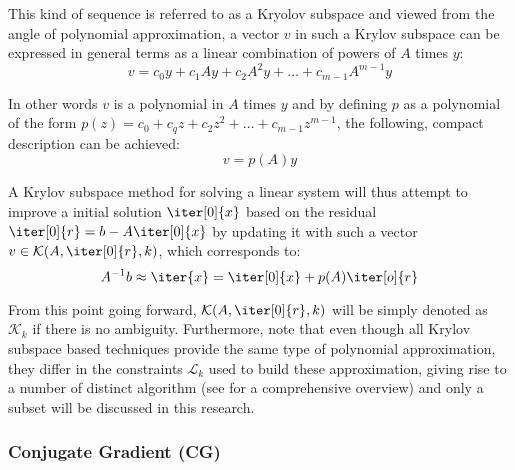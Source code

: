 \noindent This kind of sequence is referred to as a Kryolov subspace and viewed from the angle of polynomial approximation, a vector $v$ in such a Krylov subspace can be expressed in general terms as a linear combination of powers of $A$ times $y$:
\begin{equation}
\label{eqn:poly1}
    v = c_0y+c_1Ay+c_2A^2y+\dots+c_{m-1}A^{m-1}y
\end{equation}

\noindent In other words $v$ is a polynomial in $A$ times $y$ and by defining $p$ as a polynomial of the form $p(z) = c_0+c_qz+c_2z^2+\dots+c_{m-1}z^{m-1}$, the following, compact description can be achieved:
\begin{equation}
\label{eqn:poly2}
v=p(A)y  
\end{equation}

\noindent A Krylov subspace method for solving a linear system will thus attempt to improve a initial solution $\iter[0]{x}$ based on the residual $\iter[0]{r} = b-A\iter[0]{x}$ by updating it with such a vector $v \in \mathcal{K}(A, \iter[0]{r},k)$, which corresponds to:
\begin{equation}
    A^{-1}b \approx \iter{x} = \iter[0]{x}+p(A)\iter[o]{r}
\end{equation}

\noindent From this point going forward, $\mathcal{K}(A, \iter[0]{r},k)$ will be simply denoted as $\mathcal{K}_k$ if there is no ambiguity. Furthermore, note that even though all Krylov subspace based techniques provide the same type of polynomial approximation, they differ in the constraints $\mathcal{L}_k$ used to build these approximation, giving rise to a number of distinct algorithm (see \cite{saad_iterative_2003} for a comprehensive overview) and only a subset will be discussed in this research.



\subsubsection{Conjugate Gradient (CG)}
\label{sec:conjugate_gradient}
